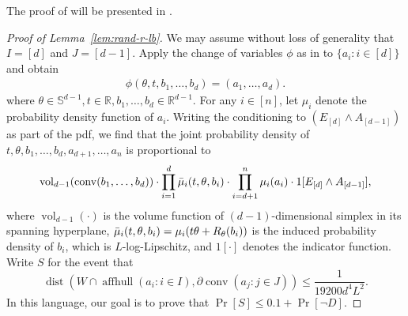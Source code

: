 \documentclass{theoretics}
\newcommand{\R}{\mathbb R}
\newcommand{\aff}{\operatorname{affhull}}
\newcommand{\conv}{\operatorname{conv}}
\newcommand{\dist}{\operatorname{dist}}
\newcommand{\vol}{\operatorname{vol}}
\begin{document}
The proof of  will be presented in .


\begin{proof}[Proof of Lemma~\ref{lem:rand-r-lb}]
We may assume without loss of generality that $I = [d]$ and $J = [d-1]$.
Apply the change of variables $\phi$ as in  to $\{a_i : i\in [d]\}$ and obtain
\begin{align*}
    \phi(\theta, t, b_1, \ldots, b_d) = (a_1, \ldots, a_d).
\end{align*}
where $\theta \in \mathbb{S}^{d-1}, t \in \R, b_1, \ldots, b_d \in \R^{d-1}$.
For any $i\in [n]$, let $\mu_i$ denote the probability density function of
$a_i$.
Writing the conditioning to $(E_{[d]} \wedge A_{[d-1]})$ as part of the pdf, we find that the joint probability density of $t,
\theta, b_1, \ldots, b_d, a_{d+1},\dots,a_n$ is proportional to
\begin{align}
    \vol_{d-1}(\conv(b_1, \ldots, b_d)) \cdot \prod_{i=1}^d \Bar{\mu}_i(t,\theta,b_i) \cdot \prod_{i=d+1}^n \mu_i(a_i) \cdot 1[E_{[d]} \wedge A_{[d-1]}], \label{eq:prob-bi}
\end{align}
where $\vol_{d-1}(\cdot )$ is the volume function of $(d-1)$-dimensional simplex in its spanning hyperplane,
$\Bar{\mu}_i(t,\theta,b_i) = \mu_i(t\theta + R_\theta(b_i))$ is the induced
probability density of $b_i$, which is $L$-log-Lipschitz, and $1[\cdot]$ denotes the indicator
function.
Write $S$ for the event that
$$\dist(W \cap \aff(a_i : i\in I), \partial \conv(a_j : j\in J )) \leq \frac{1}{19200 d^4L^2}.$$
In this language, our goal is to prove that
$\Pr[S] \leq 0.1 + \Pr[\neg D]$.


\end{proof}
\end{document}
